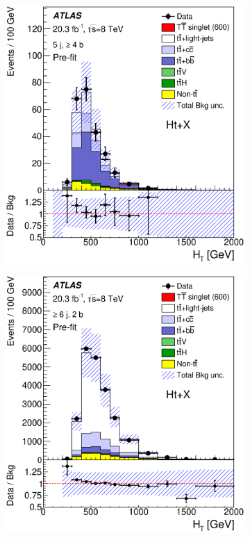 \begin{figure}[!tp]
\begin{center}
\begin{subfigure}{0.49\textwidth}
\caption{}\end{subfigure}
  \begin{subfigure}{0.49\textwidth}
\includegraphics[width=\textwidth]{Analysis/Figures_HtX/HtXPaper/HtX/prefit_unblind/HTAll_5jetex4btagin8TeV.eps} 
\caption{}\end{subfigure}
  \begin{subfigure}{0.49\textwidth}
\includegraphics[width=\textwidth]{Analysis/Figures_HtX/HtXPaper/HtX/prefit_unblind/HTAll_6jetin2btagex8TeV.eps}

\end{subfigure}
\end{center}
\end{figure}
